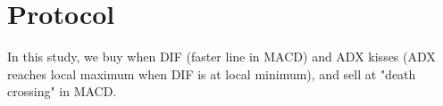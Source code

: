 \section{Protocol}
In this study, we buy when DIF (faster line in MACD) and ADX kisses (ADX reaches local maximum when DIF is at local minimum), and sell at "death crossing" in MACD.
